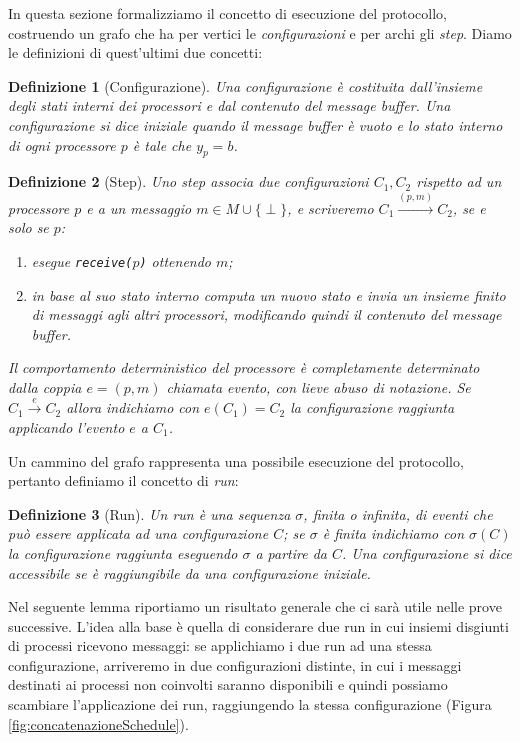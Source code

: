 \documentclass{article}
\newtheorem{definizione}{Definizione}
\begin{document}
In questa sezione formalizziamo il concetto di esecuzione del
protocollo, costruendo un grafo che ha per vertici le
\emph{configurazioni} e per archi gli \emph{step}. Diamo le
definizioni di quest'ultimi due concetti:

\begin{definizione}[Configurazione]
  Una \emph{configurazione} \`e costituita dall'insieme degli stati
  interni dei processori e dal contenuto del message buffer. Una
  configurazione si dice iniziale quando il message buffer è vuoto e
  lo stato interno di ogni processore $p$ è tale che $y_p = b$.
\end{definizione}

\begin{definizione}[Step]
  Uno \emph{step} associa due configurazioni $C_1, C_2$ rispetto ad un
  processore $p$ e a un messaggio $m \in M\cup\{\perp\}$, e
  scriveremo $C_1 \xrightarrow{(p,m)} C_2$, se e solo
  se $p$:
  \begin{enumerate}
  \item esegue \texttt{receive($p$)} ottenendo $m$;
  \item in base al suo stato interno computa un nuovo stato e invia un
    insieme finito di messaggi agli altri processori, modificando
    quindi il contenuto del message buffer.
  \end{enumerate} 
  Il comportamento deterministico del processore è completamente
  determinato dalla coppia $e=(p,m)$ chiamata evento, con lieve abuso
  di notazione. Se $C_1 \xrightarrow{e} C_2$ allora indichiamo con
  $e(C_1)=C_2$ la configurazione raggiunta applicando l'evento $e$ a
  $C_1$.
\end{definizione}

Un cammino del grafo rappresenta una possibile esecuzione del
protocollo, pertanto definiamo il concetto di \emph{run}:

\begin{definizione}[Run]
  Un \emph{run} è una sequenza $\sigma$, finita o infinita, di eventi
  che può essere applicata ad una configurazione $C$; se $\sigma$ è
  finita indichiamo con $\sigma(C)$ la configurazione raggiunta
  eseguendo $\sigma$ a partire da $C$. Una configurazione si dice
  \emph{accessibile} se \`e raggiungibile da una configurazione
  iniziale.
\end{definizione}

Nel seguente lemma riportiamo un risultato generale che ci sar\`a
utile nelle prove successive. L'idea alla base \`e quella di
considerare due run in cui insiemi disgiunti di processi ricevono
messaggi: se applichiamo i due run ad una stessa configurazione,
arriveremo in due configurazioni distinte, in cui i messaggi destinati
ai processi non coinvolti saranno disponibili e quindi possiamo
scambiare l'applicazione dei run, raggiungendo la stessa
configurazione (Figura \ref{fig:concatenazioneSchedule}).
\end{document}

